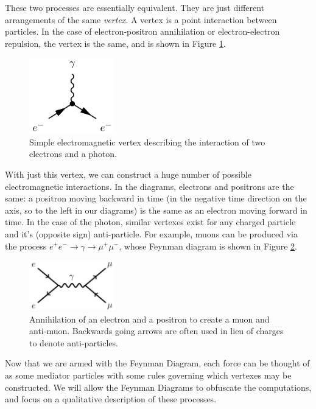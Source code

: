 These two processes are essentially equivalent. They are just different arrangements of the same \textit{vertex}. A vertex is a point interaction between particles. In the case of electron-positron annihilation or electron-electron repulsion, the vertex is the same, and is shown in Figure \ref{Fig:Intro:Vertex1}.
\begin{figure}[h]
    \centering
        \includegraphics[width=0.33\textwidth]{F1/Vertex1}
        \caption{Simple electromagnetic vertex describing the interaction of two electrons and a photon.}
        \label{Fig:Intro:Vertex1}
\end{figure}
With just this vertex, we can construct a huge number of possible electromagnetic interactions. In the diagrams, electrons and positrons are the same: a positron moving backward in time (in the negative time direction on the axis, so to the left in our diagrams) is the same as an electron moving forward in time. In the case of the photon, similar vertexes exist for any charged particle and it's (opposite sign) anti-particle. For example, muons can be produced via the process $e^+e^-\rightarrow\gamma\rightarrow\mu^+\mu^-$, whose Feynman diagram is shown in Figure \ref{Fig:Intro:Feynman3}.
\begin{figure}[h]
    \centering
        \includegraphics[width=0.33\textwidth]{F1/Feynman3}
        \caption{Annihilation of an electron and a positron to create a muon and anti-muon. Backwards going arrows are often used in lieu of charges to denote anti-particles.}
        \label{Fig:Intro:Feynman3}
\end{figure}
Now that we are armed with the Feynman Diagram, each force can be thought of as some mediator particles with some rules governing which vertexes may be constructed. We will allow the Feynman Diagrams to obfuscate the computations, and focus on a qualitative description of these processes.

